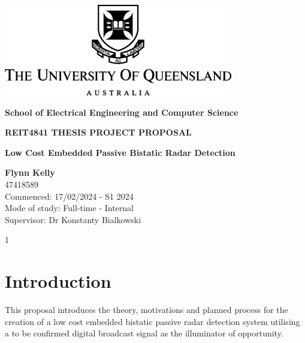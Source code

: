 \documentclass[12pt,a4paper]{article}
\begin{document}
\begin{titlepage}
    \begin{center}
        \vspace*{1cm}

        \includegraphics[width=0.75\textwidth]{UQLogo.jpg}
        
        \vspace{1.5cm}
        
        \textbf{\Large{School of Electrical Engineering and Computer Science}}
        
        \vspace{2.5cm}
        
        \textbf{\Large{REIT4841 THESIS  PROJECT PROPOSAL}}
        
        \vspace{0.5cm}

        \textbf{\Large{Low Cost Embedded Passive Bistatic Radar Detection}}
        
        \vspace{2cm}
        
        \textbf{Flynn Kelly}\\
        47418589\\
        
        Commenced: 17/02/2024 - S1 2024\\
        Mode of study: Full-time - Internal\\
        Supervisor: Dr Konstanty Bialkowski
        
        \vfill
        
        \vspace{0.8cm}
        
        \Large{1}
        
    \end{center}
\end{titlepage}

\tableofcontents
\clearpage


\section{Introduction}
This proposal introduces the theory, motivations and planned process for the creation of a low cost embedded bistatic passive radar detection system utilising a to be confirmed digital broadcast signal as the illuminator of opportunity. 
\end{document}
